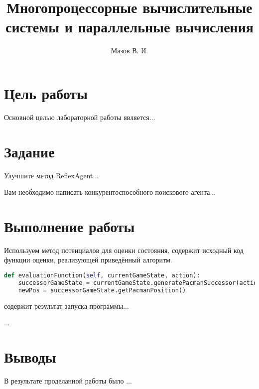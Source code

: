 \documentclass{lab_report}
\begin{document}
\title{Многопроцессорные вычислительные системы и параллельные вычисления}
\author{Мазов В. И.}

\maketitle

\tableofcontents

\section{Цель работы}
Основной целью лабораторной работы является...


\section{Задание}
\begin{task}
	Улучшите метод ReflexAgent...
\end{task}

\begin{task}
	Вам необходимо написать конкурентоспособного поискового агента...
\end{task}

\section{Выполнение работы}

\taskDoneSection
Используем метод потенциалов для оценки состояния.  содержит исходный код функции оценки, реализующей приведённый алгоритм.

\begin{lstlisting}[language={Python}, label={lis:eval}, caption={Функция оценки}, captionpos=t]
def evaluationFunction(self, currentGameState, action): 
	successorGameState = currentGameState.generatePacmanSuccessor(action)
	newPos = successorGameState.getPacmanPosition()
\end{lstlisting}

 содержит результат запуска программы...


\taskDoneSection
...

\section{Выводы}
В результате проделанной работы было ...
\end{document}
